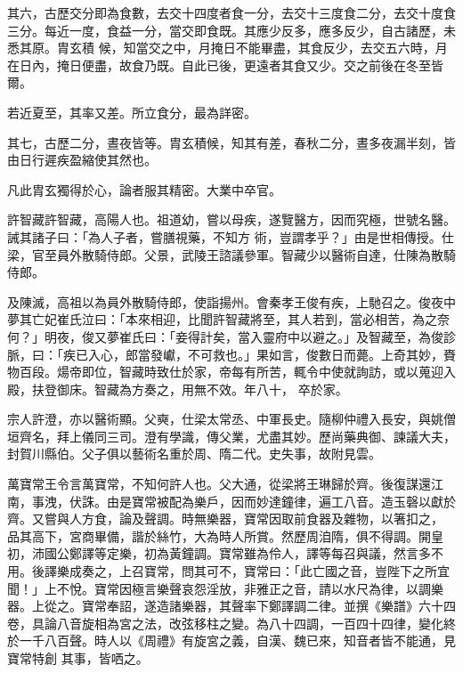 \begin{pinyinscope}
 其六，古歷交分即為食數，去交十四度者食一分，去交十三度食二分，去交十度食三分。每近一度，食益一分，當交即食既。其應少反多，應多反少，自古諸歷，未悉其原。胄玄積
 候，知當交之中，月掩日不能畢盡，其食反少，去交五六時，月在日內，掩日便盡，故食乃既。自此已後，更遠者其食又少。交之前後在冬至皆爾。



 若近夏至，其率又差。所立食分，最為詳密。



 其七，古歷二分，晝夜皆等。胄玄積候，知其有差，春秋二分，晝多夜漏半刻，皆由日行遲疾盈縮使其然也。



 凡此胄玄獨得於心，論者服其精密。大業中卒官。



 許智藏許智藏，高陽人也。祖道幼，嘗以母疾，遂覽醫方，因而究極，世號名醫。誡其諸子曰：「為人子者，嘗膳視藥，不知方
 術，豈謂孝乎？」由是世相傳授。仕梁，官至員外散騎侍郎。父景，武陵王諮議參軍。智藏少以醫術自達，仕陳為散騎侍郎。



 及陳滅，高祖以為員外散騎侍郎，使詣揚州。會秦孝王俊有疾，上馳召之。俊夜中夢其亡妃崔氏泣曰：「本來相迎，比聞許智藏將至，其人若到，當必相苦，為之奈何？」明夜，俊又夢崔氏曰：「妾得計矣，當入靈府中以避之。」及智藏至，為俊診脈，曰：「疾已入心，郎當發巘，不可救也。」果如言，俊數日而薨。上奇其妙，賚物百段。煬帝即位，智藏時致仕於家，帝每有所苦，輒令中使就詢訪，或以蒐迎入殿，扶登御床。智藏為方奏之，用無不效。年八十，
 卒於家。



 宗人許澄，亦以醫術顯。父奭，仕梁太常丞、中軍長史。隨柳仲禮入長安，與姚僧垣齊名，拜上儀同三司。澄有學識，傳父業，尤盡其妙。歷尚藥典御、諫議大夫，封賀川縣伯。父子俱以藝術名重於周、隋二代。史失事，故附見雲。



 萬寶常王令言萬寶常，不知何許人也。父大通，從梁將王琳歸於齊。後復謀還江南，事洩，伏誅。由是寶常被配為樂戶，因而妙達鐘律，遍工八音。造玉磬以獻於齊。又嘗與人方食，論及聲調。時無樂器，寶常因取前食器及雜物，以箸扣之，
 品其高下，宮商畢備，諧於絲竹，大為時人所賞。然歷周洎隋，俱不得調。開皇初，沛國公鄭譯等定樂，初為黃鐘調。寶常雖為伶人，譯等每召與議，然言多不用。後譯樂成奏之，上召寶常，問其可不，寶常曰：「此亡國之音，豈陛下之所宜聞！」上不悅。寶常因極言樂聲哀怨淫放，非雅正之音，請以水尺為律，以調樂器。上從之。寶常奉詔，遂造諸樂器，其聲率下鄭譯調二律。並撰《樂譜》六十四卷，具論八音旋相為宮之法，改弦移柱之變。為八十四調，一百四十四律，變化終於一千八百聲。時人以《周禮》有旋宮之義，自漢、魏已來，知音者皆不能通，見寶常特創
 其事，皆哂之。




\end{pinyinscope}
